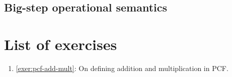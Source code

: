\subsection{Big-step operational semantics}

\section{List of exercises}
\begin{enumerate}
\item \cref{exer:pcf-add-mult}: On defining addition and multiplication in PCF.
\end{enumerate}




